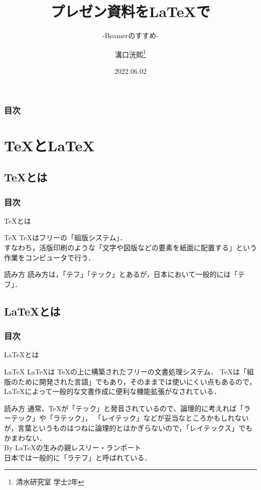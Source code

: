 \documentclass[dvipdfmx]{beamer}
\title[Cykut LT]{プレゼン資料を\LaTeX で}
\subtitle{-Beamerのすすめ-}
\author[K.MIZOGUCHI]{溝口洸熙\thanks{清水研究室 学士2年}}
\date{2022.06.02}
\institute[KUT]{高知工科大学 情報学群}
\begin{document}
\begin{frame}
\titlepage
\end{frame}

\begin{frame}
    \frametitle{目次}
    \tableofcontents
\end{frame}

\section{\TeX と\LaTeX}
\subsection{\TeX とは}
\begin{frame}
\frametitle{目次}
\tableofcontents[currentsection,sectionstyle=show/shaded,subsectionstyle=show/shaded]
\end{frame}

\begin{frame}{\TeX とは}
    \begin{block}{\TeX}
        \TeX はフリーの「組版システム」．\\
    すなわち，活版印刷のような「文字や図版などの要素を紙面に配置する」という作業をコンピュータで行う．
    \end{block}
    \begin{alertblock}{読み方}
        読み方は，「テフ」「テック」とあるが，日本において一般的には「テフ」．
    \end{alertblock}
\end{frame}

\subsection{\LaTeX とは}
\begin{frame}
\frametitle{目次}
\tableofcontents[currentsection,sectionstyle=show/shaded,subsectionstyle=show/shaded]
\end{frame}

\begin{frame}{\LaTeX とは}
    \begin{block}{\LaTeX}
        \LaTeX は \TeX の上に構築されたフリーの文書処理システム．
    \TeX は「組版のために開発された言語」でもあり，そのままでは使いにくい点もあるので，
    \LaTeX によって一般的な文書作成に便利な機能拡張がなされている．
    \end{block}
    \begin{alertblock}{読み方}
        通常、\TeX が「テック」と発音されているので、論理的に考えれば「ラーテック」や「ラテック」，
        「レイテック」などが妥当なところかもしれないが，言葉というものはつねに論理的とはかぎらないので，「レイテックス」でもかまわない．\\
        By \LaTeX の生みの親レスリー・ランポート\\
        日本では一般的に「ラテフ」と呼ばれている．
    \end{alertblock}
\end{frame}
\end{document}
